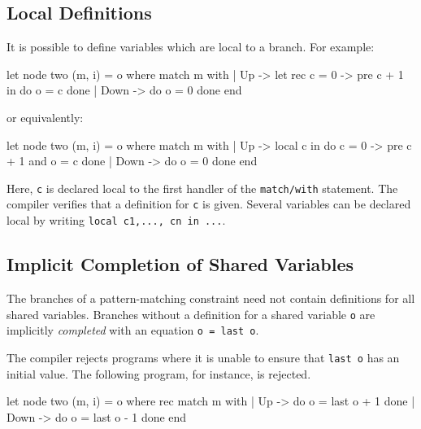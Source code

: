 \documentclass[11pt,titlepage,twoside]{report}
\makeatletter
\newcommand{\zls}[1]{{\@span{class="zelusinline"}#1}}
\newcommand{\zls}[1]{\texttt{#1}}
\renewcommand{\zls}[1]{\texttt{#1}}
\makeatother
\begin{document}
\subsection{Local Definitions\label{localdef}} %

It is possible to define variables which are local to a branch. For
example:
\begin{chklisting}[include=updownmodes]
let node two (m, i) = o where
  match m with
  | Up -> let rec c = 0 -> pre c + 1 in
          do o = c done
  | Down -> do o = 0 done
  end
\end{chklisting}
or equivalently:
\begin{chklisting}[include=updownmodes]
let node two (m, i) = o where
  match m with
  | Up -> local c in
          do c = 0 -> pre c + 1
          and o = c done
  | Down -> do o = 0 done
  end
\end{chklisting}
Here, \zls{c} is declared local to the first handler of the \zls{match/with} 
statement.
The compiler verifies that a definition for \zls{c} is given.
Several variables can be declared local by writing
\zls{local c1,..., cn in ...}.

\subsection{Implicit Completion of Shared Variables\label{completeshared}} %

The branches of a pattern-matching constraint need not contain definitions 
for all shared variables.
Branches without a definition for a shared variable \zls{o} are implicitly 
\emph{completed} with an equation \zls{o = last o}.

The compiler rejects programs where it is unable to ensure that \zls{last o} 
has an initial value.
The following program, for instance, is rejected.
\begin{chklisting}[withresult,fail,include=updownmodes]
let node two (m, i) = o where
  rec match m with
      | Up -> do o = last o + 1 done
      | Down -> do o = last o - 1 done
      end
\end{chklisting}


\end{document}
